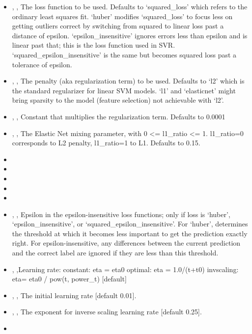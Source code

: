 \begin{itemize}
  \item {} , ,
  The loss function to be used.
  Defaults to ‘squared\_loss’ which refers to the ordinary
  least squares fit.
  ‘huber’ modifies ‘squared\_loss’ to focus less on
  getting outliers correct by switching from squared to linear loss past a
  distance of epsilon.
  ‘epsilon\_insensitive’ ignores errors less than epsilon and
  is linear past that; this is the loss function used in SVR.
  ‘squared\_epsilon\_insensitive’ is the same
  but becomes squared loss past a tolerance of epsilon.
  \item {} , ,
  The penalty (aka regularization term) to be used.
  Defaults to ‘l2’ which is the standard regularizer for linear SVM models.
  ‘l1’ and ‘elasticnet’ might bring sparsity to the model (feature
  selection) not achievable with ‘l2’.
  \item {} , ,
  Constant that multiplies the regularization term.
  Defaults to 0.0001
  \item {} , ,
  The Elastic Net mixing parameter, with 0 <= l1\_ratio <= 1.
  l1\_ratio=0 corresponds to L2 penalty, l1\_ratio=1
  to L1.
  Defaults to 0.15.
  \item {}
  \item {}
  \item {}
  \item {}
  \item \verDescriptionB
  \item {} , ,
  Epsilon in the epsilon-insensitive loss functions; only if loss is
  ‘huber’, ‘epsilon\_insensitive’, or
  ‘squared\_epsilon\_insensitive’.
  For ‘huber’, determines the threshold at which it becomes less important
  to get the prediction exactly right.
  For epsilon-insensitive, any differences between the current prediction and
  the correct label are ignored if they are less than this threshold.
  \item {} , ,Learning rate: constant: eta = eta0 optimal: eta = 1.0/(t+t0)
  invscaling: eta= eta0 / pow(t, power\_t) [default]
  \item {} , ,
  The initial learning rate [default 0.01].
  \item {} , ,
  The exponent for inverse scaling learning rate [default 0.25].
  \item \warmStartDescription{}
\end{itemize}

